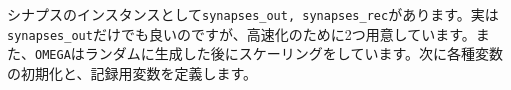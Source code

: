 シナプスのインスタンスとして\texttt{synapses\_out, synapses\_rec}があります。実は\texttt{synapses\_out}だけでも良いのですが、高速化のために2つ用意しています。また、\texttt{OMEGA}はランダムに生成した後にスケーリングをしています。次に各種変数の初期化と、記録用変数を定義します。
